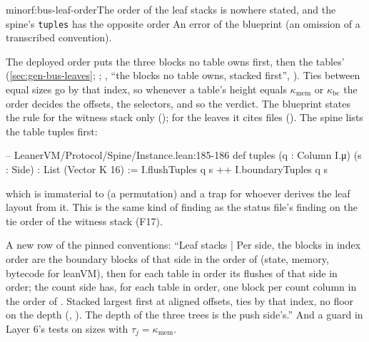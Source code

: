 \begin{finding}{minor}{f:bus-leaf-order}{The order of the leaf stacks is nowhere stated, and the spine's \texttt{tuples} has the opposite order}
 An error of the blueprint (an omission of a transcribed convention).

 The deployed order puts the three blocks no table owns first, then the tables'
(\cref{sec:gen-bus-leaves}; ; , ``the blocks no table owns,
stacked first'', ). Ties between equal sizes go by that index, so whenever a table's
height equals $κ_{\mathrm{mem}}$ or $κ_{\mathrm{bc}}$ the order decides the offsets, the
selectors, and so the verdict. The blueprint states the rule for the witness stack only
(); for the leaves it cites files (). The spine lists the table tuples
first:
\begin{leancode}
-- LeanerVM/Protocol/Spine/Instance.lean:185-186
def tuples (q : Column I.μ) (s : Side) : List (Vector K 16) :=
  I.flushTuples q s ++ I.boundaryTuples q s
\end{leancode}

which is immaterial to  (a permutation) and a trap for whoever derives the leaf
layout from it. This is the same kind of finding as the status file's finding on the tie order of
the witness stack (F17).

 A new row of the pinned conventions: ``Leaf stacks | Per side, the blocks
in index order are the boundary blocks of that side in the order of  (state,
memory, bytecode for leanVM), then for each table in order its flushes of that side in order;
the count side has, for each table in order, one block per count column in the order of
. Stacked largest first at aligned offsets, ties by that index, no floor on the
depth (, ). The depth of the three trees is the push
side's.'' And a guard in Layer 6's tests on sizes with $τ_j = κ_{\mathrm{mem}}$.
\end{finding}

